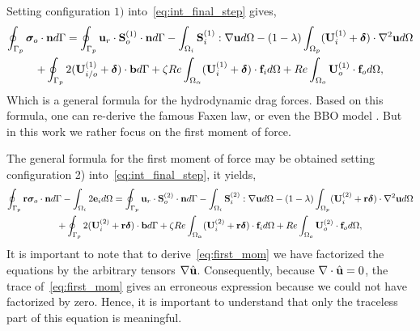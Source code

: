 Setting configuration $1)$ into~\ref{eq:int_final_step} gives, 
\begin{multline}
    \intS[p]{\bm\sigma_{o}\cdot \textbf{n}}
    =
    \intS[p]{\textbf{u}_{r}\cdot \textbf{S}_{o}^{(1)}\cdot \textbf{n}}
    - \intO[i]{ \textbf{S}_{i}^{(1)} :\grad\textbf{u}}
    - (1-\lambda) \intO[p]{(\textbf{U}_{i}^{(1)} + \bm\delta) \cdot \grad^2 \textbf{u} }\\ 
    + \intS[p]{2 (\textbf{U}_{i/o}^{(1)} + \bm\delta) \cdot  \textbf{b}}
    + \zeta Re \intO{(\textbf{U}_{i}^{(1)} + \bm\delta)\cdot \textbf{f}_{i}} 
    + Re\intO[o]{\textbf{U}_{o}^{(1)}\cdot \textbf{f}_{o}},
    \label{eq:drag_force}
\end{multline}
Which is a general formula for the hydrodynamic drag forces. 
Based on this formula, one can re-derive the famous Faxen law, or even the BBO model \citep{kim2013microhydrodynamics}. But in this work we rather focus on the first moment of force. 

The general formula for the first moment of force may be obtained setting configuration 2) into~\ref{eq:int_final_step}, it yields,
\begin{multline}
    \intS[p]{\textbf{r}\bm\sigma_{o}\cdot \textbf{n}}
    - \intO[i]{2\textbf{e}_i}
    =
    \intS[p]{\textbf{u}_{r}\cdot \textbf{S}^{(2)}_{o}\cdot \textbf{n}}
    - \intO[i]{\textbf{S}^{(2)}_{i}:\grad\textbf{u}}
    - (1-\lambda) \intO[p]{(\textbf{U}_{i}^{(2)} + \textbf{r}\bm\delta) \cdot \grad^2 \textbf{u} }\\ 
    + \intS[p]{2(\textbf{U}_{i}^{(2)} + \textbf{r}\bm\delta) \cdot  \textbf{b}}
    + \zeta Re \intO{(\textbf{U}_{i}^{(2)} + \textbf{r}\bm\delta)\cdot \textbf{f}_{i}} 
    + Re\intO[o]{\textbf{U}_{o}^{(2)}\cdot \textbf{f}_{o}},
    \label{eq:first_mom}
\end{multline}
It is important to note that to derive~\ref{eq:first_mom} we have factorized the equations by the arbitrary tensors $\mathbf{\nabla} \hat{\textbf{u}}$. 
Consequently, because $\mathbf{\nabla}\cdot \hat{\textbf{u}} = 0$, the trace of~\ref{eq:first_mom} gives an erroneous expression because we could not have factorized by zero.  
Hence, it is important to understand that only the traceless part of this equation is meaningful. 

